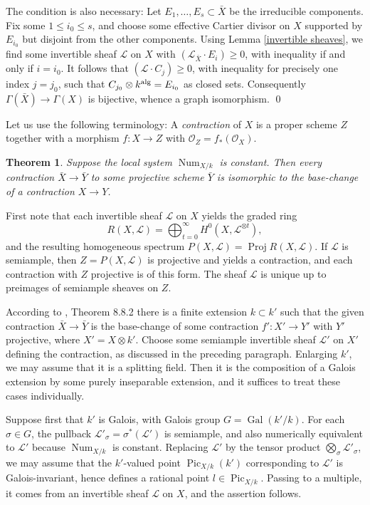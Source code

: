 \documentclass[oneside, 12pt]{amsart}
\newcommand\mylabel[1]{\label{#1}\marginpar{\vspace{-1ex}\medskip\medskip\footnotesize \tt #1}}
\renewcommand\mylabel[1]{\label{#1}}
\newtheorem{theorem}{Theorem}[section]
\theoremstyle{definition}
\theoremstyle{remark}
\newcommand{\shL}{\mathscr{L}}
\newcommand{\alg}{\text{\rm alg}}
\newcommand{\Gal}{\operatorname{Gal}}
\newcommand{\Num}{\operatorname{Num}}
\renewcommand{\O}{\mathscr{O}}
\newcommand{\Pic}{\operatorname{Pic}}
\newcommand{\Proj}{\operatorname{Proj}}
\newcommand{\ra}{\rightarrow}
\newcommand{\bY}{{\bar{Y}}}
\newcommand{\bX}{{\bar{X}}}
\begin{document}
The condition is also necessary: Let $E_1,\ldots,E_s\subset\bX$ be the irreducible components.  
Fix some $1\leq i_0\leq s$, and choose some effective 
Cartier divisor  on $X$ supported by $E_{i_0}$ but disjoint from the other components.
Using  Lemma \ref{invertible sheaves}, we find  some invertible sheaf $\shL$ on $X$ with $(\shL_\bX\cdot E_i)\geq 0$,
with inequality if and only if $i=i_0$.
It follows that $(\shL\cdot  C_j)\geq 0$, with inequality for precisely one index $j=j_0$,
such that $C_{j_0}\otimes k^\alg=E_{i_0}$ as closed sets.
Consequently $\Gamma(\bX)\ra\Gamma(X)$ is bijective, whence a graph isomorphism.
\qed

\medskip
Let us use the following terminology: A \emph{contraction} of $X$ is a proper scheme $Z$ together with a   morphism
$f:X\ra Z$ with $\O_Z=f_*(\O_X)$.

\begin{theorem}
\mylabel{projective contractions}
Suppose  the local system $\Num_{X/k}$ is constant.  
Then every contraction $\bX\ra \bY$  to some projective scheme $\bY$ is isomorphic to the base-change of a contraction $X\ra Y$.
\end{theorem}

\proof
First note that each  invertible sheaf $\shL$ on $X$ yields the graded ring 
$$
R(X,\shL)=\bigoplus_{t=0}^\infty H^0(X,\shL^{\otimes t}),
$$
and the resulting homogeneous spectrum $P(X,\shL)=\Proj R(X,\shL)$. If $\shL$ is semiample,
then $Z=P(X,\shL)$ is projective and yields a contraction, and each   contraction with $Z$ projective is of this form.
The sheaf  $\shL$ is unique up to preimages of semiample sheaves on $Z$.

According to \cite{EGA IVc}, Theorem 8.8.2 there is a finite   extension $k\subset k'$
such that the given contraction $\bX\ra \bY$ is the base-change of some contraction $f':X'\ra Y'$ 
with $Y'$ projective, where $X'=X\otimes k'$. Choose some semiample invertible sheaf $\shL'$
on $X'$ defining the contraction, as discussed in the preceding paragraph.
Enlarging $k'$, we may assume that it is a splitting field. Then it is the composition
of a Galois extension by some purely inseparable extension, and it suffices to treat these cases
individually.

Suppose first that $k'$ is Galois, with   Galois group $G=\Gal(k'/k)$.  
For each $\sigma\in G$, the pullback $\shL'_\sigma=\sigma^*(\shL')$ is semiample, and also numerically equivalent to $\shL'$
because $\Num_{X/k}$ is constant.
Replacing $\shL'$ by the tensor product $\bigotimes_\sigma\shL'_\sigma$, we may assume that the $k'$-valued
point $\Pic_{X/k}(k')$ corresponding to $\shL'$ is Galois-invariant, hence defines a rational point $l\in\Pic_{X/k}$.
Passing to a multiple, it comes from an invertible sheaf $\shL$ on $X$, and the assertion follows.
\end{document}

